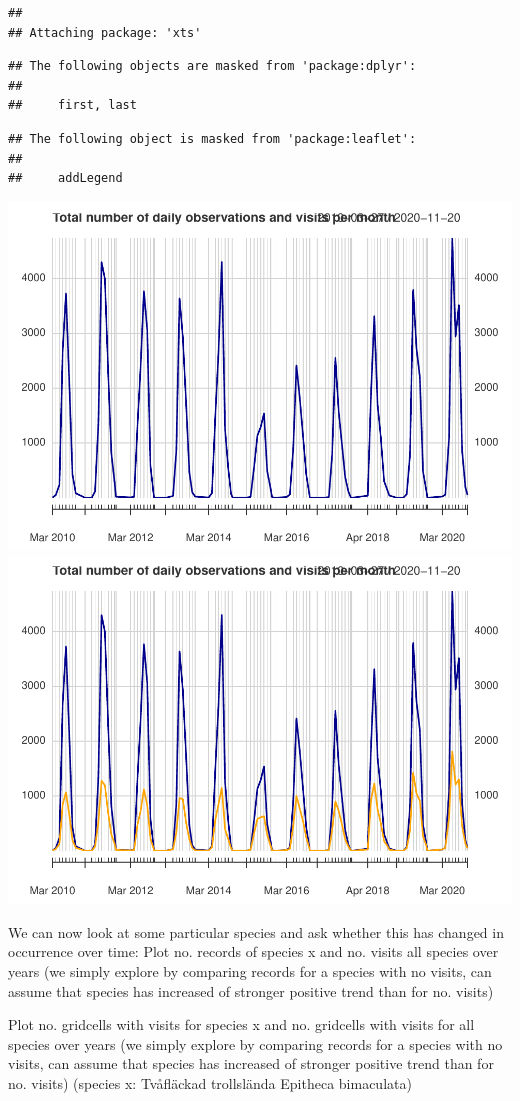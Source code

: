 \documentclass[
  10pt,
]{article}
\begin{document}
\begin{verbatim}
## 
## Attaching package: 'xts'
\end{verbatim}

\begin{verbatim}
## The following objects are masked from 'package:dplyr':
## 
##     first, last
\end{verbatim}

\begin{verbatim}
## The following object is masked from 'package:leaflet':
## 
##     addLegend
\end{verbatim}

\includegraphics{r-tools-tutorial_files/figure-latex/monthlyPlot-1.pdf} \includegraphics{r-tools-tutorial_files/figure-latex/monthlyPlot-2.pdf}

We can now look at some particular species and ask whether this has changed in occurrence over time:
Plot no. records of species x and no. visits all species over years (we simply explore by comparing records for a species with no visits, can assume that species has increased of stronger positive trend than for no. visits)

Plot no. gridcells with visits for species x and no. gridcells with visits for all species over years (we simply explore by comparing records for a species with no visits, can assume that species has increased of stronger positive trend than for no. visits)
(species x: Tvåfläckad trollslända Epitheca bimaculata)

  
\end{document}
